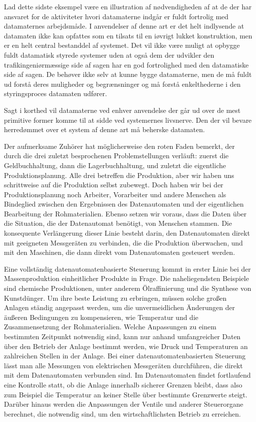 {Lad dette sidste eksempel være en illustration af nødvendigheden af at de der har ansvaret for 
de aktiviteter hvori datamaterne indgår er fuldt fortrolig med datamaternes arbejdsmåde. I anvendelser af denne art er det helt indlysende at datamaten ikke kan opfattes som en tilsats til en iøvrigt lukket konstruktion, men er en helt central bestanddel af systemet. Det vil ikke være muligt at opbygge fuldt datamatisk styrede systemer uden at også dem der udvikler den trafikingeniørmæssige side af sagen har en god fortrolighed med den datamatiske side af sagen. De behøver ikke selv at kunne bygge datamaterne, men de må fuldt ud forstå deres muligheder og begrænsninger og må forstå enkelthederne i den styringsproces datamaten udfører. 

Sagt i korthed vil datamaterne ved enhver anvendelse der går ud over de mest primitive former komme til at sidde ved systemernes livsnerve. Den der vil bevare herredømmet over et system af denne art må beherske datamaten.
}{
Der aufmerksame Zuhörer hat möglicherweise den roten Faden bemerkt, der durch die drei zuletzt besprochenen Problemstellungen verläuft: zuerst die Geldbuchhaltung, dann die Lagerbuchhaltung, und zuletzt die eigentliche Produktionsplanung. Alle drei betreffen die Produktion, aber wir haben uns schrittweise auf die Produktion selbst zubewegt. Doch haben wir bei der Produktionsplanung noch Arbeiter, Vorarbeiter und andere Menschen als Bindeglied zwischen den Ergebnissen des Datenautomaten und der eigentlichen Bearbeitung der Rohmaterialien. Ebenso setzen wir voraus, dass die Daten über die Situation, die der Datenautomat benötigt, von Menschen stammen. Die konsequente Verlängerung dieser Linie besteht darin, den Datenautomaten direkt mit geeigneten Messgeräten zu verbinden, die die Produktion überwachen, und mit den Maschinen, die dann direkt vom Datenautomaten gesteuert werden.

Eine vollständig datenautomatenbasierte Steuerung kommt in erster Linie bei der Massenproduktion einheitlicher Produkte in Frage. Die naheliegendsten Beispiele sind chemische Produktionen, unter anderem Ölraffinierung und die Synthese von Kunstdünger. Um ihre beste Leistung zu erbringen, müssen solche großen Anlagen ständig angepasst werden, um die unvermeidlichen Änderungen der äußeren Bedingungen zu kompensieren, wie Temperatur und die Zusammensetzung der Rohmaterialien. Welche Anpassungen zu einem bestimmten Zeitpunkt notwendig sind, kann nur anhand umfangreicher Daten über den Betrieb der Anlage bestimmt werden, wie Druck und Temperaturen an zahlreichen Stellen in der Anlage. Bei einer datenautomatenbasierten Steuerung lässt man alle Messungen von elektrischen Messgeräten durchführen, die direkt mit dem Datenautomaten verbunden sind. Im Datenautomaten findet fortlaufend eine Kontrolle statt, ob die Anlage innerhalb sicherer Grenzen bleibt, dass also zum Beispiel die Temperatur an keiner Stelle über bestimmte Grenzwerte steigt. Darüber hinaus werden die Anpassungen der Ventile und anderer Steuerorgane berechnet, die notwendig sind, um den wirtschaftlichsten Betrieb zu erreichen.

}
